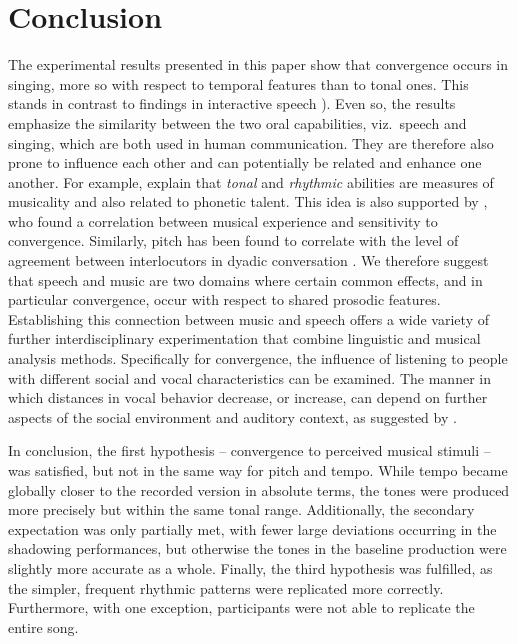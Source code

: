 \section{Conclusion}
\label{sec:conclusion_shadowing}


The experimental results presented in this paper show that convergence occurs in singing, more so with respect to temporal features than to tonal ones.
This stands in contrast to findings in interactive speech \citep[e.g.,][]{Raveh2019InterspeechAlexa}).
Even so, the results emphasize the similarity between the two oral capabilities, viz.\ speech and singing, which are both used in human communication.
They are therefore also prone to influence each other and can potentially be related and enhance one another.
For example, \citet[][p. 216]{Nardo2009musicality} explain that \emph{tonal} and \emph{rhythmic} abilities are measures of musicality and also related to phonetic talent.
This idea is also supported by \citet{Tsang2018musical}, who found a correlation between musical experience and sensitivity to convergence.
Similarly, pitch has been found to correlate with the level of agreement between interlocutors in dyadic conversation \citep{Okada2012interpreting}.
We therefore suggest that speech and music are two domains where certain common effects, and in particular convergence, occur with respect to shared prosodic features.
Establishing this connection between music and speech offers a wide variety of further interdisciplinary experimentation that combine linguistic and musical analysis methods.
Specifically for convergence, the influence of listening to people with different social and vocal characteristics can be examined.
The manner in which distances in vocal behavior decrease, or increase, can depend on further aspects of the social environment and auditory context, as suggested by \citet{Noy1999psychoanalysis}.

In conclusion, the first hypothesis -- convergence to perceived musical stimuli -- was satisfied, but not in the same way for pitch and tempo.
While tempo became globally closer to the recorded version in absolute terms, the tones were produced more precisely but within the same tonal range.
Additionally, the secondary expectation was only partially met, with fewer large deviations occurring in the shadowing performances, but otherwise the tones in the baseline production were slightly more accurate as a whole.
Finally, the third hypothesis was fulfilled, as the simpler, frequent rhythmic patterns were replicated more correctly.
Furthermore, with one exception, participants were not able to replicate the entire song.



